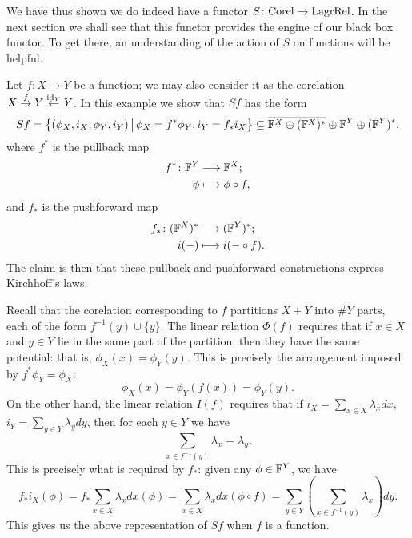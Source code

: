 We have thus shown we do indeed have a functor $S{\colon} \mathrm{Corel} \to
\mathrm{LagrRel}$. In the next section we shall see that this functor provides
the engine of our black box functor. To get there, an understanding of the
action of $S$ on functions will be helpful.

\begin{example} \label{ex:sympfunction}
  Let $f: X \to Y$ be a function; we may also consider it as the corelation $X
  \stackrel{f}\to Y \stackrel{\mathrm{id}_Y}\leftarrow Y$. In this example we show that
  $Sf$ has the form 
  \[
    Sf = \big\{(\phi_X,i_X,\phi_Y,i_Y) \, \big\vert \, \phi_X = f^\ast\phi_Y,
    i_Y = f_\ast i_X \big\} \subseteq \overline{{\mathbb F}^X \oplus ({\mathbb F}^X)^\ast} \oplus
    {\mathbb F}^Y \oplus ({\mathbb F}^Y)^\ast,
  \]
  where $f^\ast$ is the pullback map
  \begin{align*}
    f^\ast{\colon} {\mathbb F}^Y &\longrightarrow {\mathbb F}^X; \\
    \phi &\longmapsto \phi \circ f,
  \end{align*}
  and $f_\ast$ is the pushforward map
  \begin{align*}
    f_\ast{\colon} ({\mathbb F}^X)^\ast &\longrightarrow ({\mathbb F}^Y)^\ast; \\
    i(-) &\longmapsto i(-\circ f).
  \end{align*}
  The claim is then that these pullback and pushforward constructions express
  Kirchhoff's laws.

  Recall that the corelation corresponding to $f$ partitions $X+Y$ into $\#Y$
  parts, each of the form $f^{-1}(y) \cup \{y\}$. The linear relation $\Phi(f)$
  requires that if $x \in X$ and $y \in Y$ lie in the same part of the
  partition, then they have the same potential: that is, $\phi_X(x) =
  \phi_Y(y)$. This is precisely the arrangement imposed by $f^\ast \phi_Y =
  \phi_X$: 
  \[
    \phi_X(x) = \phi_Y(f(x)) =\phi_Y(y).
  \] 
  On the other hand, the linear relation $I(f)$ requires that if $i_X = \sum_{x 
  \in X}\lambda_xdx$, $i_Y = \sum_{y \in Y}\lambda_y dy$, then for each $y \in Y$
  we have 
  \[
    \sum_{x \in f^{-1}(y)} \lambda_x = \lambda_y.
  \]
  This is precisely what is required by $f_\ast$: given any $\phi \in {\mathbb F}^Y$, we
  have
  \[
    f_\ast i_X(\phi) = f_\ast \sum_{x \in X}\lambda_xdx(\phi) = \sum_{x
    \in X}\lambda_xdx(\phi \circ f)= \sum_{y \in Y}\left( \sum_{x \in f^{-1}(y)}
    \lambda_x\right)dy.
  \]
  This gives us the above representation of $Sf$ when $f$ is a function.
\end{example}


